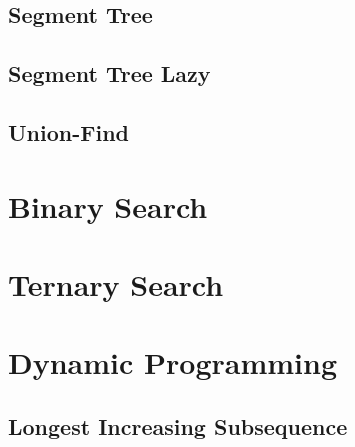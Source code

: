 \documentclass[10pt,landscape,twocolumn,a4paper,notitlepage]{article}
\begin{document}
  \subsection{Segment Tree}
  

  \subsection{Segment Tree Lazy}
  

  \subsection{Union-Find}
  


\section{Binary Search}


\section{Ternary Search}


%     

\section{Dynamic Programming}
  \subsection{Longest Increasing Subsequence}
  
\end{document}
